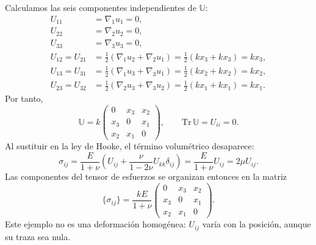 Calculamos las seis componentes independientes de $\mathbb U$:
\[
\begin{aligned}
U_{11}&=\nabla_1 u_1=0,\\
U_{22}&=\nabla_2 u_2=0,\\
U_{33}&=\nabla_3 u_3=0,\\
U_{12}=U_{21}
&=\frac{1}{2}(\nabla_1 u_2+\nabla_2 u_1)
=\frac{1}{2}(kx_3+kx_3)=kx_3,\\
U_{13}=U_{31}
&=\frac{1}{2}(\nabla_1 u_3+\nabla_3 u_1)
=\frac{1}{2}(kx_2+kx_2)=kx_2,\\
U_{23}=U_{32}
&=\frac{1}{2}(\nabla_2 u_3+\nabla_3 u_2)
=\frac{1}{2}(kx_1+kx_1)=kx_1.
\end{aligned}
\]
Por tanto,
\[
\mathbb U=k\begin{pmatrix}
0&x_3&x_2\\
x_3&0&x_1\\
x_2&x_1&0
\end{pmatrix},
\qquad \mathrm{Tr}\,\mathbb U=U_{ii}=0.
\]
Al sustituir en la ley de Hooke, el término volumétrico desaparece:
\[
\sigma_{ij}=\frac{E}{1+\nu}
\left(U_{ij}+\frac{\nu}{1-2\nu}U_{kk}\delta_{ij}\right)
=\frac{E}{1+\nu}U_{ij}=2\mu U_{ij}.
\]
Las componentes del tensor de esfuerzos se organizan entonces en la matriz
\[
\boxed{\{\sigma_{ij}\}=\frac{kE}{1+\nu}
\begin{pmatrix}
0&x_3&x_2\\
x_3&0&x_1\\
x_2&x_1&0
\end{pmatrix}}.
\]
Este ejemplo no es una deformación homogénea: $U_{ij}$ varía con la posición, aunque su traza sea nula.